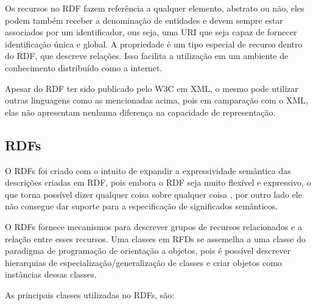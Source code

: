 \vskip 0.25cm

Os recursos no RDF fazem referência a qualquer elemento, abstrato ou não, eles 
podem também receber a denominação de entidades e devem sempre estar associados 
por um identificador, ous seja, uma URI que seja capaz de fornecer identificação 
única e global. A propriedade é um tipo especial de recurso dentro do RDF, que 
descreve relações. Isso facilita a utilização em um ambiente de conhecimento 
distribuído como a internet.

Apesar do RDF ter sido publicado pelo W3C em XML, o mesmo pode utilizar outras 
linguagens como as mencionadas acima, pois em camparação com o XML, elas não 
apresentam nenhuma diferença na capacidade de representação.

\subsection{RDFs}
\label{sec:rdfs}

O RDFs foi criado com o intuito de expandir a expressividade semântica das 
descrições criadas em RDF, pois embora o RDF seja muito flexível e expressivo, 
o que torna possível dizer qualquer coisa sobre qualquer coisa 
\cite{hebeler2011semantic}, por outro lado ele não consegue dar suporte para 
a especificação de significados semânticos.

O RDFs fornece mecanismos para descrever grupos de recursos relacionados e a 
relação entre esses recursos. Uma classes em RFDs se 
assemelha a uma classe do paradigma de programação de orientação a objetos, pois
é possível descrever hierarquias de especialização/generalização de classes e
criar objetos como instâncias dessas classes.

As principais classes utilizadas no RDFs, são:

